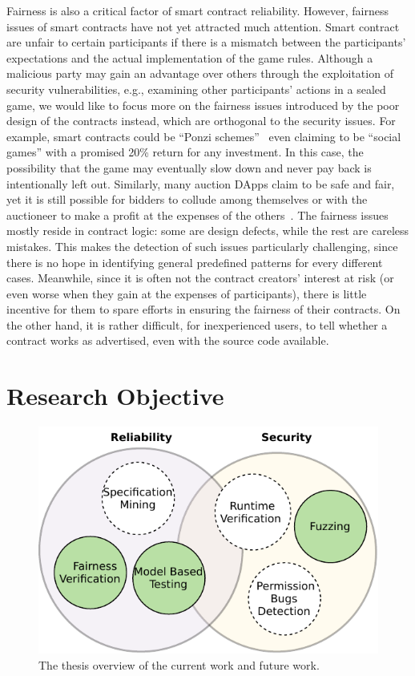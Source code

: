 Fairness is also a critical factor of smart contract reliability. 
However, fairness issues of smart contracts have not yet attracted much attention.
Smart contract are unfair to certain participants if there is a mismatch between the participants' expectations and the actual implementation of the game rules.
Although a malicious party may gain an advantage over others through the exploitation of security vulnerabilities, e.g., examining other participants' actions in a sealed game,
we would like to focus more on the fairness issues introduced by the poor design of the contracts instead, which are orthogonal to the security issues.
For example, smart contracts could be ``Ponzi schemes''~\cite{BARTOLETTI2020259} even claiming to be ``social games'' with a promised 20\% return for any investment.
In this case, the possibility that the game may eventually slow down and never pay back is intentionally left out.
Similarly, many auction DApps claim to be safe and fair, yet it is still possible for bidders to collude among themselves or with the auctioneer to make a profit at the expenses of the others~\cite{wu2018cream}.
The fairness issues mostly reside in contract logic: some are design defects, while the rest are careless mistakes.
This makes the detection of such issues particularly challenging, since there is no hope in identifying general predefined patterns for every different cases.
Meanwhile, since it is often not the contract creators' interest at risk (or even worse when they gain at the expenses of participants), there is little incentive for them to spare efforts in ensuring the fairness of their contracts.
On the other hand, it is rather difficult, for inexperienced users, to tell whether a contract works as advertised, even with the source code available.



\section{Research Objective}

\begin{figure}
	\centering
	\includegraphics{./Figures/Chapter1/ThesisOverview}
	\caption{The thesis overview of the current work and future work.}
	\label{fig: thesisoverview}
\end{figure}

